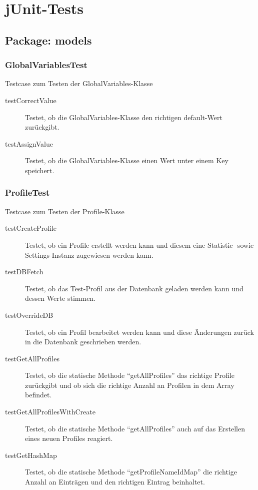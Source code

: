 \documentclass[parskip=full]{scrreprt}
\begin{document}
\chapter{jUnit-Tests}

\section{Package: models}

\subsection{GlobalVariablesTest}

Testcase zum Testen der GlobalVariables-Klasse

\begin{description} 
\item[testCorrectValue]
	Testet, ob die GlobalVariables-Klasse den richtigen default-Wert zurückgibt.
\item[testAssignValue]
	Testet, ob die GlobalVariables-Klasse einen Wert unter einem Key speichert.
\end{description}

\subsection{ProfileTest}

Testcase zum Testen der Profile-Klasse

\begin{description}
	\item[testCreateProfile] Testet, ob ein Profile erstellt werden kann und diesem eine Statistic- sowie Settings-Instanz zugewiesen werden kann.
	\item[testDBFetch] Testet, ob das Test-Profil aus der Datenbank geladen werden kann und dessen Werte stimmen.
	\item[testOverrideDB] Testet, ob ein Profil bearbeitet werden kann und diese Änderungen zurück in die Datenbank geschrieben werden.
	\item[testGetAllProfiles] Testet, ob die statische Methode \enquote{getAllProfiles} das richtige Profile zurückgibt und ob sich die richtige Anzahl an Profilen in dem Array befindet.
	\item[testGetAllProfilesWithCreate] Testet, ob die statische Methode \enquote{getAllProfiles} auch auf das Erstellen eines neuen Profiles reagiert.
	\item[testGetHashMap] Testet, ob die statische Methode \enquote{getProfileNameIdMap} die richtige Anzahl an Einträgen und den richtigen Eintrag beinhaltet.
\end{description}
\end{document}
